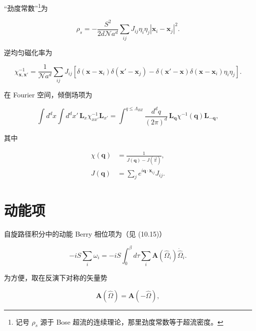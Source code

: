 “劲度常数”\footnote{记号 $\rho_{s}$ 源于 Bose 超流的连续理论，那里劲度常数等于超流密度。}为

\begin{equation*}
\rho_ {s} = - \frac {S ^ {2}}{2 d \mathcal {N} a ^ {d}} \sum_ {ij} J _ {ij} \eta_ {i} \eta_ {j} \left| \mathbf {x} _ {i} - \mathbf {x} _ {j} \right| ^ {2}.
\tag{12.20}
\end{equation*}

逆均匀磁化率为

\begin{equation*}
\chi_ {\mathbf {x}, \mathbf {x} '} ^ {- 1} = \frac {1}{\mathcal {N} a ^ {d}} \sum_ {ij} J _ {ij} \left[ \delta ( \mathbf {x} - \mathbf {x} _ {i} ) \delta ( \mathbf {x} ' - \mathbf {x} _ {j} ) - \delta ( \mathbf {x} ' - \mathbf {x} ) \delta ( \mathbf {x} - \mathbf {x} _ {i} ) \eta_ {i} \eta_ {j} \right].
\tag{12.21}
\end{equation*}

在 Fourier 空间，倾倒场项为

\begin{equation*}
\int d ^ {d} x \int d ^ {d} x ' \, \mathbf {L} _{x} \chi_{xx '} ^ {- 1} \mathbf {L}_{x '} = \int^{q \leq \Lambda_{BZ}} \frac {d ^ {d} q}{( 2 \pi ) ^ {d}} \, \mathbf {L}_{\mathbf {q}} \chi^ {- 1} ( \mathbf {q} ) \mathbf {L}_{- \mathbf {q}} ,
\tag{12.22}
\end{equation*}

其中

\begin{align*}
\chi ( \mathbf {q} ) & = \frac {1}{J ( \mathbf {q} ) - J ( \vec {\pi} )} ,\\
J ( \mathbf {q} ) & = \sum_ {j} e ^ {i \mathbf {q} \cdot \mathbf {x} _ {ij}} J _ {ij} .
\tag{12.23}
\end{align*}

\section{动能项}

自旋路径积分中的动能 Berry 相位项为（见 (10.15)）

\begin{equation*}
- i S \sum_ {i} \omega_ {i} = - i S \int_ {0} ^ {\beta} d \tau \sum_ {i} \mathbf {A} ( \hat {\Omega} _ {i} ) \dot {\hat {\Omega}} _ {i}.
\tag{12.24}
\end{equation*}

为方便，取在反演下对称的矢量势

\begin{equation*}
\mathbf {A} ( \hat {\Omega} ) = \mathbf {A} ( - \hat {\Omega} ) ,
\tag{12.25}
\end{equation*}

